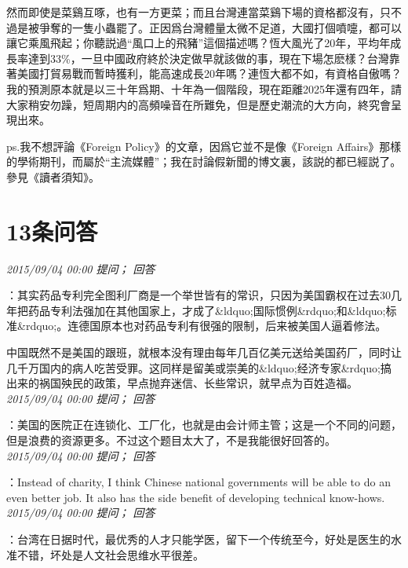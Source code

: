 \documentclass[twocolumn]{ctexart}
\begin{document}
然而即使是菜鷄互啄，也有一方更菜；而且台灣連當菜鷄下場的資格都沒有，只不過是被爭奪的一隻小蟲罷了。正因爲台灣體量太微不足道，大國打個噴嚏，都可以讓它乘風飛起；你聽説過“風口上的飛豬”這個描述嗎？恆大風光了20年，平均年成長率達到33\%，一旦中國政府終於決定做早就該做的事，現在下場怎麽樣？台灣靠著美國打貿易戰而暫時獲利，能高速成長20年嗎？連恆大都不如，有資格自傲嗎？我的預測原本就是以三十年爲期、十年為一個階段，現在距離2025年還有四年，請大家稍安勿躁，短周期内的高頻噪音在所難免，但是歷史潮流的大方向，終究會呈現出來。

ps.我不想評論《Foreign Policy》的文章，因爲它並不是像《Foreign Affairs》那樣的學術期刊，而屬於“主流媒體”；我在討論假新聞的博文裏，該説的都已經説了。參見《讀者須知》。
\\

\section{13条问答}

\textit{\hfill\noindent\small 2015/09/04 00:00 提问； 回答}

：其实药品专利完全图利厂商是一个举世皆有的常识，只因为美国霸权在过去30几年把药品专利法强加在其他国家上，才成了\&ldquo;国际惯例\&rdquo;和\&ldquo;标准\&rdquo;。连德国原本也对药品专利有很强的限制，后来被美国人逼着修法。

中国既然不是美国的跟班，就根本没有理由每年几百亿美元送给美国药厂，同时让几千万国内的病人吃苦受罪。这同样是留美或崇美的\&ldquo;经济专家\&rdquo;搞出来的祸国殃民的政策，早点抛弃迷信、长些常识，就早点为百姓造福。\\

\textit{\hfill\noindent\small 2015/09/04 00:00 提问； 回答}

：美国的医院正在连锁化、工厂化，也就是由会计师主管；这是一个不同的问题，但是浪费的资源更多。不过这个题目太大了，不是我能很好回答的。\\

\textit{\hfill\noindent\small 2015/09/04 00:00 提问； 回答}

：Instead of charity, I think Chinese national governments will be able to do an even better job. It also has the side benefit of developing technical know-hows.\\

\textit{\hfill\noindent\small 2015/09/04 00:00 提问； 回答}

：台湾在日据时代，最优秀的人才只能学医，留下一个传统至今，好处是医生的水准不错，坏处是人文社会思维水平很差。
\end{document}
